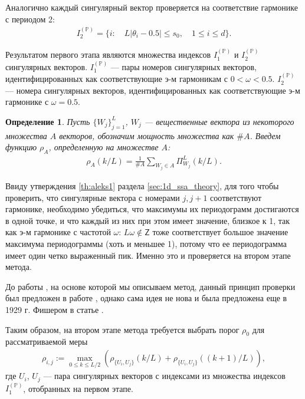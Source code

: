 \documentclass[specialist,
               substylefile = spbu.rtx,
               subf,href,colorlinks=true, 12pt]{disser}
\newtheorem{defn}{Определение}
\begin{document}
Аналогично каждый сингулярный вектор проверяется на соответствие гармонике с периодом 2:
\begin{gather} \label{eq:I_2_P}
I_2^{(\mathbb{P})} = \{i: \quad  L |\theta_{i} - 0.5 | \leqslant s_0, \quad 1 \leqslant i \leqslant d\}.
\end{gather}

Результатом первого этапа являются множества индексов $I_1^{(\mathbb{P})}$ и $I_2^{(\mathbb{P})}$ сингулярных векторов. $I_1^{(\mathbb{P})}$ --- пары номеров сингулярных векторов, идентифицированных как соответствующие э-м гармоникам с $0 < \omega < 0.5$.  $I_2^{(\mathbb{P})}$ --- номера сингулярных векторов, идентифицированных как соответствующие э-м гармонике с $\omega = 0.5$.

\begin{defn} \label{def:rho}
Пусть $\{W_j\}_{j=1}^{L}$, $W_j$ --- вещественные вектора из некоторого множества $A$ векторов, обозначим мощность множества как $\# A$. Введем функцию $\rho_A$, определенную на множестве $A$:
\begin{gather*}
\rho_{A}(k/L) = \frac{1}{\#A} \sum_{W_j \in A}{\Pi^{L}_{W_j}{(k/L)}}.
\end{gather*}
\end{defn}

Ввиду утверждения \ref{th:aleks1} раздела \ref{sec:1d_ssa_theory}, для того чтобы проверить, что сингулярные вектора с номерами $j, j + 1$ соответствуют гармонике, необходимо убедиться, что максимумы их периодограмм достигаются в одной точке, и что каждый из них при этом имеет значение, близкое к 1, так как э-м гармонике с частотой $\omega$: $L \omega \not \in \mathsf{Z}$ тоже соответствует большое значение максимума периодограммы (хоть и меньшее 1), потому что ее периодограмма имеет один четко выраженный пик.  Именно это и проверяется на втором этапе метода.

До работы \cite{Alexandrov2006}, на основе которой мы описываем метод, данный принцип проверки был предложен в работе \cite{Vautard1992}, однако сама идея не нова и была предложена еще в 1929 г. Фишером в статье \cite{Fisher1929}.

Таким образом, на втором этапе метода
 требуется выбрать порог $\rho_0$ для рассматриваемой меры
\begin{gather} \label{eq:rho_ij}
\rho_{i,j} := \max_{0 \leqslant k \leqslant L/2}{\left(\rho_{\{U_i,U_j\}}(k/L) + \rho_{\{U_i,U_j\}}((k+1)/L)\right)},
\end{gather}
где $U_i$, $U_j$ --- пара сингулярных векторов с индексами из множества индексов $I_1^{(\mathbb{P})}$, отобранных на первом этапе.
\end{document}
